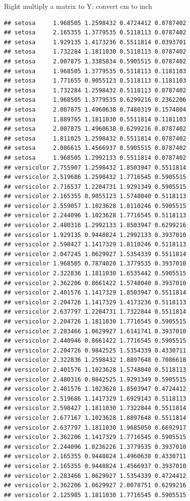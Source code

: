 \documentclass[
  ignorenonframetext,
]{beamer}
\begin{document}
\begin{frame}[fragile]{Right multiply a matrix to Y: convert cm to inch}
\begin{verbatim}
## setosa     1.968505 1.2598432 0.4724412 0.0787402
## setosa     2.165355 1.3779535 0.5118113 0.0787402
## setosa     1.929135 1.4173236 0.5511814 0.0393701
## setosa     1.732284 1.1811030 0.5118113 0.0787402
## setosa     2.007875 1.3385834 0.5905515 0.0787402
## setosa     1.968505 1.3779535 0.5118113 0.1181103
## setosa     1.771655 0.9055123 0.5118113 0.1181103
## setosa     1.732284 1.2598432 0.5118113 0.0787402
## setosa     1.968505 1.3779535 0.6299216 0.2362206
## setosa     2.007875 1.4960638 0.7480319 0.1574804
## setosa     1.889765 1.1811030 0.5511814 0.1181103
## setosa     2.007875 1.4960638 0.6299216 0.0787402
## setosa     1.811025 1.2598432 0.5511814 0.0787402
## setosa     2.086615 1.4566937 0.5905515 0.0787402
## setosa     1.968505 1.2992133 0.5511814 0.0787402
## versicolor 2.755907 1.2598432 1.8503947 0.5511814
## versicolor 2.519686 1.2598432 1.7716545 0.5905515
## versicolor 2.716537 1.2204731 1.9291349 0.5905515
## versicolor 2.165355 0.9055123 1.5748040 0.5118113
## versicolor 2.559057 1.1023628 1.8110246 0.5905515
## versicolor 2.244096 1.1023628 1.7716545 0.5118113
## versicolor 2.480316 1.2992133 1.8503947 0.6299216
## versicolor 1.929135 0.9448824 1.2992133 0.3937010
## versicolor 2.598427 1.1417329 1.8110246 0.5118113
## versicolor 2.047245 1.0629927 1.5354339 0.5511814
## versicolor 1.968505 0.7874020 1.3779535 0.3937010
## versicolor 2.322836 1.1811030 1.6535442 0.5905515
## versicolor 2.362206 0.8661422 1.5748040 0.3937010
## versicolor 2.401576 1.1417329 1.8503947 0.5511814
## versicolor 2.204726 1.1417329 1.4173236 0.5118113
## versicolor 2.637797 1.2204731 1.7322844 0.5511814
## versicolor 2.204726 1.1811030 1.7716545 0.5905515
## versicolor 2.283466 1.0629927 1.6141741 0.3937010
## versicolor 2.440946 0.8661422 1.7716545 0.5905515
## versicolor 2.204726 0.9842525 1.5354339 0.4330711
## versicolor 2.322836 1.2598432 1.8897648 0.7086618
## versicolor 2.401576 1.1023628 1.5748040 0.5118113
## versicolor 2.480316 0.9842525 1.9291349 0.5905515
## versicolor 2.401576 1.1023628 1.8503947 0.4724412
## versicolor 2.519686 1.1417329 1.6929143 0.5118113
## versicolor 2.598427 1.1811030 1.7322844 0.5511814
## versicolor 2.677167 1.1023628 1.8897648 0.5511814
## versicolor 2.637797 1.1811030 1.9685050 0.6692917
## versicolor 2.362206 1.1417329 1.7716545 0.5905515
## versicolor 2.244096 1.0236226 1.3779535 0.3937010
## versicolor 2.165355 0.9448824 1.4960638 0.4330711
## versicolor 2.165355 0.9448824 1.4566937 0.3937010
## versicolor 2.283466 1.0629927 1.5354339 0.4724412
## versicolor 2.362206 1.0629927 2.0078751 0.6299216
## versicolor 2.125985 1.1811030 1.7716545 0.5905515

\end{verbatim}
\end{frame}
\end{document}
